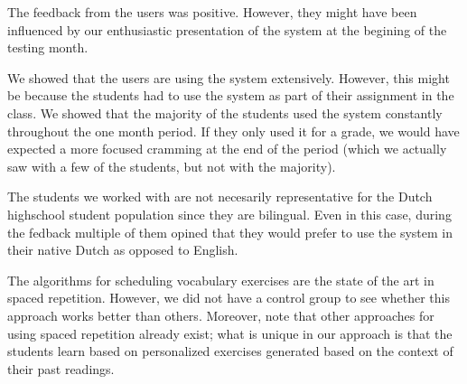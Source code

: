 The feedback from the users was positive. However, they might have been influenced by our enthusiastic presentation of the system at the begining of the testing month. 



We showed that the users are using the system extensively. However, this might be because the students had to use the system as part of their assignment in the class. We showed that the majority of the students used the system constantly throughout the one month period. If they only used it for a grade, we would have expected a more focused cramming at the end of the period (which we actually saw with a few of the students, but not with the majority). 

The students we worked with are not necesarily representative for the Dutch highschool student population since they are bilingual. Even in this case, during the fedback multiple of them opined that they would prefer to use the system in their native Dutch as opposed to English.


The algorithms for scheduling vocabulary exercises are the state of the art in spaced repetition. However, we did not have a control group to see whether this approach works better than others. Moreover, note that other approaches for using spaced repetition already exist; what is unique in our approach is that the students learn based on personalized exercises generated based on the context of their past readings.






